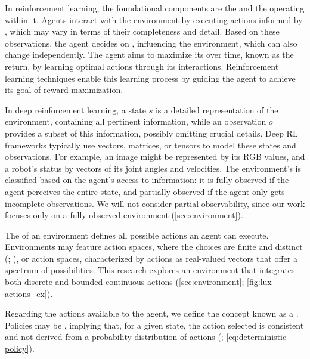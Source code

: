     \noindent In reinforcement learning, the foundational components are the  and the  operating within it. Agents interact with the environment by executing actions informed by , which may vary in terms of their completeness and detail. Based on these observations, the agent decides on , influencing the environment, which can also change independently. The agent aims to maximize its  over time, known as the return, by learning optimal actions through its interactions. Reinforcement learning techniques enable this learning process by guiding the agent to achieve its goal of reward maximization.
    
    \bigskip
    
    \noindent In deep reinforcement learning, a state $s$ is a detailed representation of the environment, containing all pertinent information, while an observation $o$ provides a subset of this information, possibly omitting crucial details. Deep RL frameworks typically use vectors, matrices, or tensors to model these states and observations. For example, an image might be represented by its RGB values, and a robot's status by vectors of its joint angles and velocities. The environment's  is classified based on the agent's access to information: it is fully observed if the agent perceives the entire state, and partially observed if the agent only gets incomplete observations. We will not consider partial observability, since our work focuses only on a fully observed environment (\autoref{sec:environment}).
    
    \bigskip
    
    \noindent The  of an environment defines all possible actions an agent can execute. Environments may feature  action spaces, where the choices are finite and distinct (\textcolor{deepblue}{\cite{mnih2013playing}; \cite{SilverHuangEtAl16nature}}), or  action spaces, characterized by actions as real-valued vectors that offer a spectrum of possibilities. This research explores an environment that integrates both discrete and bounded continuous actions (\autoref{sec:environment}; \autoref{fig:lux-actions_ex}).
    
    \bigskip
    
    \noindent Regarding the actions available to the agent, we define the concept known as a . Policies may be , implying that, for a given state, the action selected is consistent and not derived from a probability distribution of actions (\textcolor{deepblue}{\cite{Sutton1998}; \autoref{eq:deterministic-policy}}).
    

